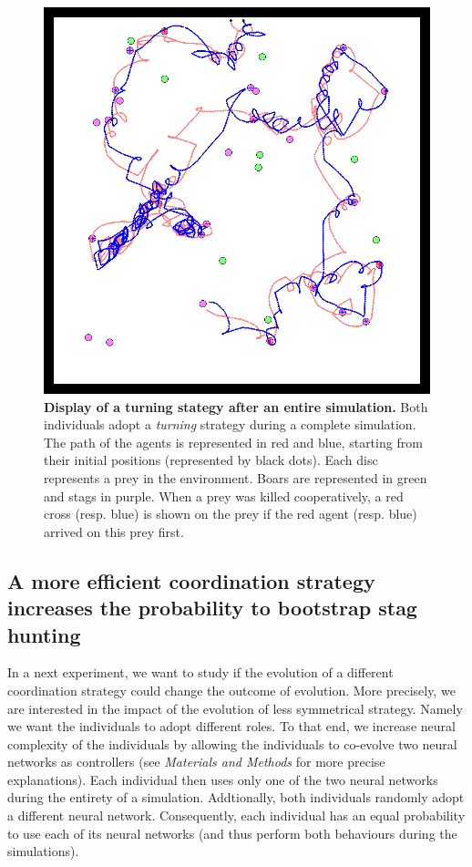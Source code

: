     \begin{figure}[h]
      \centering
        \includegraphics[width=0.7\linewidth]{fig/ArticleBio2/Fig3.png}
        \caption{\textbf{Display of a turning stategy after an entire simulation.}
        Both individuals adopt a \emph{turning} strategy during a complete simulation. The path of the agents is represented in red and blue, starting from their initial positions (represented by black dots). Each disc represents a prey in the environment. Boars are represented in green and stags in purple. When a prey was killed cooperatively, a red cross (resp. blue) is shown on the prey if the red agent (resp. blue) arrived on this prey first.}
      \label{fig:figTurningBehaviour}
    \end{figure}


  \subsection{A more efficient coordination strategy increases the probability to bootstrap stag hunting}
    In a next experiment, we want to study if the evolution of a different coordination strategy could change the outcome of evolution. More precisely, we are interested in the impact of the evolution of less symmetrical strategy. Namely we want the individuals to adopt different roles. To that end, we increase neural complexity of the individuals by allowing the individuals to co-evolve two neural networks as controllers (see \emph{Materials and Methods} for more precise explanations). Each individual then uses only one of the two neural networks during the entirety of a simulation. Addtionally, both individuals randomly adopt a different neural network. Consequently, each individual has an equal probability to use each of its neural networks (and thus perform both behaviours during the simulations).

